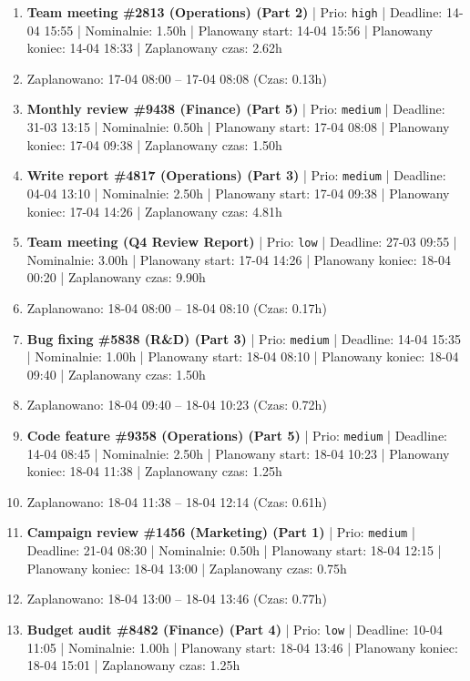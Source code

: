 {\begin{enumerate}
  \item [\textbf{14617}] \textbf{Team meeting \#2813 (Operations) (Part 2)} | Prio: \texttt{high} | Deadline: 14-04 15:55 | Nominalnie: 1.50h | Planowany start: 14-04 15:56 | Planowany koniec: 14-04 18:33 | Zaplanowany czas: 2.62h
  \item [\textbf{PRZERWA}] Zaplanowano: 17-04 08:00 -- 17-04 08:08 (Czas: 0.13h)
  \item [\textbf{14656}] \textbf{Monthly review \#9438 (Finance) (Part 5)} | Prio: \texttt{medium} | Deadline: 31-03 13:15 | Nominalnie: 0.50h | Planowany start: 17-04 08:08 | Planowany koniec: 17-04 09:38 | Zaplanowany czas: 1.50h
  \item [\textbf{14639}] \textbf{Write report \#4817 (Operations) (Part 3)} | Prio: \texttt{medium} | Deadline: 04-04 13:10 | Nominalnie: 2.50h | Planowany start: 17-04 09:38 | Planowany koniec: 17-04 14:26 | Zaplanowany czas: 4.81h
  \item [\textbf{14682}] \textbf{Team meeting (Q4 Review Report)} | Prio: \texttt{low} | Deadline: 27-03 09:55 | Nominalnie: 3.00h | Planowany start: 17-04 14:26 | Planowany koniec: 18-04 00:20 | Zaplanowany czas: 9.90h
  \item [\textbf{PRZERWA}] Zaplanowano: 18-04 08:00 -- 18-04 08:10 (Czas: 0.17h)
  \item [\textbf{14637}] \textbf{Bug fixing \#5838 (R\&D) (Part 3)} | Prio: \texttt{medium} | Deadline: 14-04 15:35 | Nominalnie: 1.00h | Planowany start: 18-04 08:10 | Planowany koniec: 18-04 09:40 | Zaplanowany czas: 1.50h
  \item [\textbf{PRZERWA}] Zaplanowano: 18-04 09:40 -- 18-04 10:23 (Czas: 0.72h)
  \item [\textbf{14661}] \textbf{Code feature \#9358 (Operations) (Part 5)} | Prio: \texttt{medium} | Deadline: 14-04 08:45 | Nominalnie: 2.50h | Planowany start: 18-04 10:23 | Planowany koniec: 18-04 11:38 | Zaplanowany czas: 1.25h
  \item [\textbf{PRZERWA}] Zaplanowano: 18-04 11:38 -- 18-04 12:14 (Czas: 0.61h)
  \item [\textbf{14653}] \textbf{Campaign review \#1456 (Marketing) (Part 1)} | Prio: \texttt{medium} | Deadline: 21-04 08:30 | Nominalnie: 0.50h | Planowany start: 18-04 12:15 | Planowany koniec: 18-04 13:00 | Zaplanowany czas: 0.75h
  \item [\textbf{PRZERWA}] Zaplanowano: 18-04 13:00 -- 18-04 13:46 (Czas: 0.77h)
  \item [\textbf{14694}] \textbf{Budget audit \#8482 (Finance) (Part 4)} | Prio: \texttt{low} | Deadline: 10-04 11:05 | Nominalnie: 1.00h | Planowany start: 18-04 13:46 | Planowany koniec: 18-04 15:01 | Zaplanowany czas: 1.25h

\end{enumerate}}
